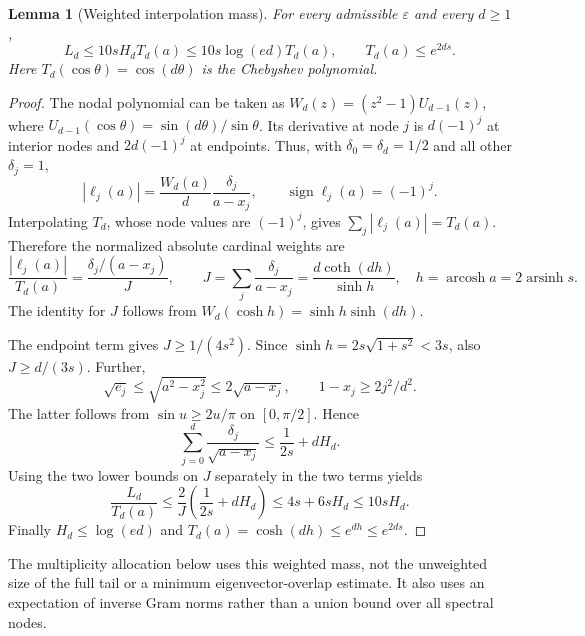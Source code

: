 \documentclass[11pt]{article}
\newtheorem{lemma}[theorem]{Lemma}
\theoremstyle{definition}
\begin{document}
\begin{lemma}[Weighted interpolation mass]\label{lem:weighted}
For every admissible $\varepsilon$ and every $d\ge1$,
\begin{equation}\label{eq:weightedbound}
L_d\le10sH_dT_d(a)
\le10s\log(ed)T_d(a),\qquad T_d(a)\le e^{2ds}.
\end{equation}
Here $T_d(\cos\theta)=\cos(d\theta)$ is the Chebyshev polynomial.
\end{lemma}
\begin{proof}
The nodal polynomial can be taken as $W_d(z)=(z^2-1)U_{d-1}(z)$, where $U_{d-1}(\cos\theta)=\sin(d\theta)/\sin\theta$. Its derivative at node $j$ is $d(-1)^j$ at interior nodes and $2d(-1)^j$ at endpoints. Thus, with $\delta_0=\delta_d=1/2$ and all other $\delta_j=1$,
\[
|\ell_j(a)|=\frac{W_d(a)}d\frac{\delta_j}{a-x_j},\qquad
\operatorname{sign}\ell_j(a)=(-1)^j.
\]
Interpolating $T_d$, whose node values are $(-1)^j$, gives $\sum_j|\ell_j(a)|=T_d(a)$. Therefore the normalized absolute cardinal weights are
\begin{equation}\label{eq:J}
\frac{|\ell_j(a)|}{T_d(a)}=\frac{\delta_j/(a-x_j)}{J},\qquad
J=\sum_j\frac{\delta_j}{a-x_j}
=\frac{d\coth(dh)}{\sinh h},\quad h=\operatorname{arcosh}a=2\operatorname{arsinh}s.
\end{equation}
The identity for $J$ follows from $W_d(\cosh h)=\sinh h\sinh(dh)$.

The endpoint term gives $J\ge1/(4s^2)$. Since $\sinh h=2s\sqrt{1+s^2}<3s$, also $J\ge d/(3s)$. Further,
\[
\sqrt{e_j}\le\sqrt{a^2-x_j^2}\le2\sqrt{a-x_j},
\qquad 1-x_j\ge2j^2/d^2.
\]
The latter follows from $\sin u\ge2u/\pi$ on $[0,\pi/2]$. Hence
\[
\sum_{j=0}^d\frac{\delta_j}{\sqrt{a-x_j}}
\le\frac1{2s}+dH_d.
\]
Using the two lower bounds on $J$ separately in the two terms yields
\[
\frac{L_d}{T_d(a)}
\le\frac2J\left(\frac1{2s}+dH_d\right)
\le4s+6sH_d\le10sH_d.
\]
Finally $H_d\le\log(ed)$ and $T_d(a)=\cosh(dh)\le e^{dh}\le e^{2ds}$.
\end{proof}

The multiplicity allocation below uses this weighted mass, not the unweighted size of the full tail or a minimum eigenvector-overlap estimate. It also uses an expectation of inverse Gram norms rather than a union bound over all spectral nodes.
\end{document}
